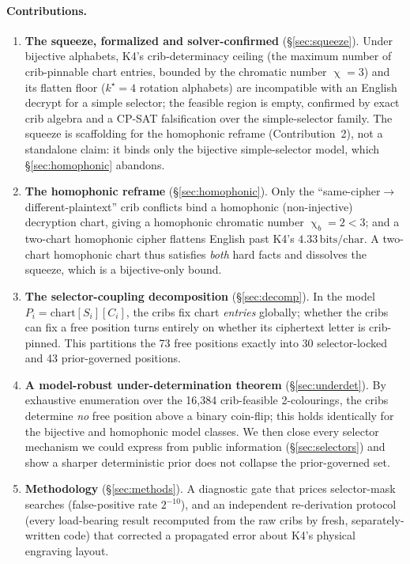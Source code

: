 \documentclass[11pt]{article}
\theoremstyle{plain}
\theoremstyle{definition}
\newcommand{\K}{\textsf{K4}}
\newcommand{\bits}{\,\text{bits/char}}
\DeclareMathOperator{\chrom}{\chi}
\begin{document}
\paragraph{Contributions.}
\begin{enumerate}[leftmargin=1.4em,itemsep=2pt]
\item \textbf{The squeeze, formalized and solver-confirmed} (\S\ref{sec:squeeze}).
Under bijective alphabets, \K{}'s crib-determinacy ceiling (the maximum number of
crib-pinnable chart entries, bounded by the chromatic number $\chrom=3$) and its
flatten floor ($k^\star=4$ rotation alphabets) are incompatible with an English
decrypt for a simple selector; the feasible region is empty, confirmed by exact crib
algebra and a CP-SAT falsification over the simple-selector family. The squeeze is
scaffolding for the homophonic reframe (Contribution~2), not a standalone claim: it
binds only the bijective simple-selector model, which \S\ref{sec:homophonic} abandons.
\item \textbf{The homophonic reframe} (\S\ref{sec:homophonic}). Only the
``same-cipher$\to$different-plaintext'' crib conflicts bind a homophonic
(non-injective) decryption chart, giving a homophonic chromatic number
$\chrom_b=2<3$; and a two-chart homophonic cipher flattens English past \K{}'s
$4.33\bits$. A two-chart homophonic chart thus satisfies \emph{both} hard facts and
dissolves the squeeze, which is a bijective-only bound.
\item \textbf{The selector-coupling decomposition} (\S\ref{sec:decomp}). In the model
$P_i=\mathrm{chart}[S_i][C_i]$, the cribs fix chart \emph{entries} globally; whether
the cribs can fix a free position turns entirely on whether its ciphertext letter is
crib-pinned. This partitions the 73 free positions exactly into 30 selector-locked
and 43 prior-governed positions.
\item \textbf{A model-robust under-determination theorem} (\S\ref{sec:underdet}).
By exhaustive enumeration over the 16{,}384 crib-feasible 2-colourings, the cribs
determine \emph{no} free position above a binary coin-flip; this holds identically
for the bijective and homophonic model classes. We then close every selector
mechanism we could express from public information (\S\ref{sec:selectors}) and show a
sharper deterministic prior does not collapse the prior-governed set.
\item \textbf{Methodology} (\S\ref{sec:methods}). A diagnostic gate that prices
selector-mask searches (false-positive rate $2^{-10}$), and an independent
re-derivation protocol (every load-bearing result recomputed from the raw cribs by
fresh, separately-written code) that corrected a propagated error about \K{}'s
physical engraving layout.
\end{enumerate}
\end{document}
